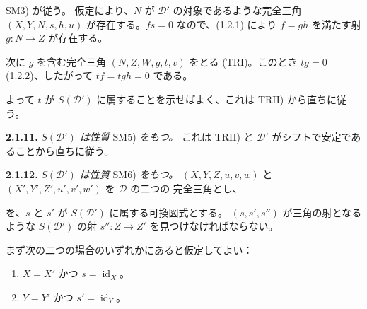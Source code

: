 \clearpage
{}%
\begingroup
\small
\setlength{\emergencystretch}{1.5em}%
\setlength{\abovedisplayskip}{2pt plus 1pt minus 1pt}%
\setlength{\belowdisplayskip}{2pt plus 1pt minus 1pt}%

\noindent SM3) が従う。
%
仮定により、$N$ が $\mathcal D'$ の対象であるような完全三角
$(X,Y,N,s,h,u)$ が存在する。$fs=0$ なので、(1.2.1) により
$f=gh$ を満たす射 $g\colon N\to Z$ が存在する。

次に $g$ を含む完全三角 $(N,Z,W,g,t,v)$ をとる (TRI)。このとき
$tg=0$ (1.2.2)、したがって $tf=tgh=0$ である。

よって $t$ が $S(\mathcal D')$ に属することを示せばよく、これは TRII)
から直ちに従う。

\medskip
\noindent\textbf{2.1.11.}\quad
{}
\emph{$S(\mathcal D')$ は性質} SM5) \emph{をもつ。}
これは TRII) と $\mathcal D'$ がシフトで安定であることから直ちに従う。

\medskip
\noindent\textbf{2.1.12.}\quad
{}
\emph{$S(\mathcal D')$ は性質} SM6) \emph{をもつ。}
$(X,Y,Z,u,v,w)$ と $(X',Y',Z',u',v',w')$ を $\mathcal D$ の二つの
完全三角とし、

\begin{center}
\end{center}

\noindent を、$s$ と $s'$ が $S(\mathcal D')$ に属する可換図式とする。
$(s,s',s'')$ が三角の射となるような $S(\mathcal D')$ の射
$s''\colon Z\to Z'$ を見つけなければならない。

まず次の二つの場合のいずれかにあると仮定してよい：

\begin{enumerate}
\renewcommand{\labelenumi}{\emph{\alph{enumi})}}
  \item {}%
  $X=X'$ かつ $s=\operatorname{id}_X$。
  \item {}%
  $Y=Y'$ かつ $s'=\operatorname{id}_Y$。
\end{enumerate}

